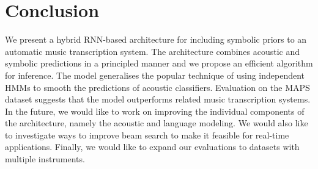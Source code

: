 \documentclass{article}
\begin{document}
\section{Conclusion}

We present a hybrid RNN-based architecture for including symbolic priors to an automatic music transcription system. The architecture combines acoustic and symbolic predictions in a principled manner and we propose an efficient algorithm for inference. The model generalises the popular technique of using independent HMMs to smooth the predictions of acoustic classifiers. Evaluation on the MAPS dataset suggests that the model outperforms related music transcription systems. In the future, we would like to work on improving the individual components of the architecture, namely the acoustic and language modeling. We would also like to investigate ways to improve beam search to make it feasible for real-time applications. Finally, we would like to expand our evaluations to datasets with multiple instruments. 





{}

\end{document}
